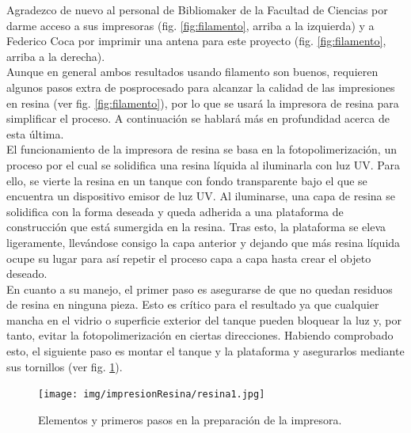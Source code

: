 \documentclass[11pt,a4paper,twoside,pdf]{article}
\numberwithin{equation}{section}
\begin{document}
Agradezco de nuevo al personal de Bibliomaker de la Facultad de Ciencias por darme acceso a sus impresoras (fig. \ref{fig:filamento}, arriba a la izquierda) y a Federico Coca por imprimir una antena para este proyecto (fig. \ref{fig:filamento}, arriba a la derecha).\\

Aunque en general ambos resultados usando filamento son buenos, requieren algunos pasos extra de posprocesado para alcanzar la calidad de las impresiones en resina (ver fig. \ref{fig:filamento}), por lo que se usará la impresora de resina para simplificar el proceso. A continuación se hablará más en profundidad acerca de esta última.\\

El funcionamiento de la impresora de resina se basa en la fotopolimerización, un proceso por el cual se solidifica una resina líquida al iluminarla con luz UV. Para ello, se vierte la resina en un tanque con fondo transparente bajo el que se encuentra un dispositivo emisor de luz UV. Al iluminarse, una capa de resina se solidifica con la forma deseada y queda adherida a una plataforma de construcción que está sumergida en la resina. Tras esto, la plataforma se eleva ligeramente, llevándose consigo la capa anterior y dejando que más resina líquida ocupe su lugar para así repetir el proceso capa a capa hasta crear el objeto deseado.\\

En cuanto a su manejo, el primer paso es asegurarse de que no quedan residuos de resina en ninguna pieza. Esto es crítico para el resultado ya que cualquier mancha en el vidrio o superficie exterior del tanque pueden bloquear la luz y, por tanto, evitar la fotopolimerización en ciertas direcciones. Habiendo comprobado esto, el siguiente paso es montar el tanque y la plataforma y asegurarlos mediante sus tornillos (ver fig. \ref{fig:impresoraResina1}).
\begin{figure}[!h]
    \centering
    \texttt{[image: img/impresionResina/resina1.jpg]}
    \vspace{-0.65cm}
    \caption{Elementos y primeros pasos en la preparación de la impresora.}
    \label{fig:impresoraResina1}
\end{figure}
\end{document}
